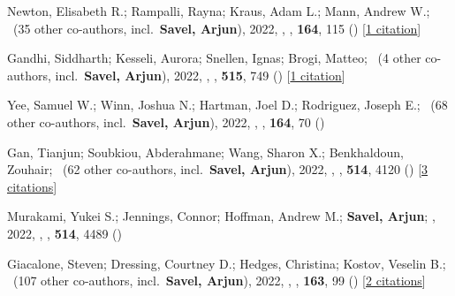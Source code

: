 \item[{\color{numcolor}\scriptsize15}] Newton, Elisabeth R.; Rampalli, Rayna; Kraus, Adam L.; Mann, Andrew W.; \etal\ ({35} other co-authors, incl.\ \textbf{Savel, Arjun}), 2022, , \aj, \textbf{164}, 115 () [\href{https://ui.adsabs.harvard.edu/abs/2022AJ....164..115N}{1 citation}]

\item[{\color{numcolor}\scriptsize14}] Gandhi, Siddharth; Kesseli, Aurora; Snellen, Ignas; Brogi, Matteo; \etal\ ({4} other co-authors, incl.\ \textbf{Savel, Arjun}), 2022, , \mnras, \textbf{515}, 749 () [\href{https://ui.adsabs.harvard.edu/abs/2022MNRAS.515..749G}{1 citation}]

\item[{\color{numcolor}\scriptsize13}] Yee, Samuel W.; Winn, Joshua N.; Hartman, Joel D.; Rodriguez, Joseph E.; \etal\ ({68} other co-authors, incl.\ \textbf{Savel, Arjun}), 2022, , \aj, \textbf{164}, 70 ()

\item[{\color{numcolor}\scriptsize12}] Gan, Tianjun; Soubkiou, Abderahmane; Wang, Sharon X.; Benkhaldoun, Zouhair; \etal\ ({62} other co-authors, incl.\ \textbf{Savel, Arjun}), 2022, , \mnras, \textbf{514}, 4120 () [\href{https://ui.adsabs.harvard.edu/abs/2022MNRAS.514.4120G}{3 citations}]

\item[{\color{numcolor}\scriptsize11}] Murakami, Yukei S.; Jennings, Connor; Hoffman, Andrew M.; \textbf{Savel, Arjun}; \etal, 2022, , \mnras, \textbf{514}, 4489 ()

\item[{\color{numcolor}\scriptsize10}] Giacalone, Steven; Dressing, Courtney D.; Hedges, Christina; Kostov, Veselin B.; \etal\ ({107} other co-authors, incl.\ \textbf{Savel, Arjun}), 2022, , \aj, \textbf{163}, 99 () [\href{https://ui.adsabs.harvard.edu/abs/2022AJ....163...99G}{2 citations}]

